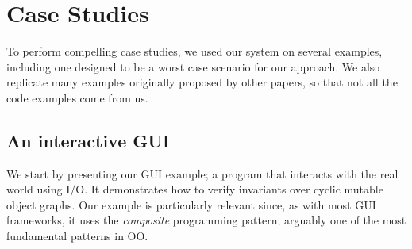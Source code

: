 
\SS\section{Case Studies} %
\label{s:case-studyAll}
To perform compelling case studies, we used our system on several examples, including one designed to be a worst case scenario for our approach. We also replicate many examples originally proposed by other papers, so that 
not all the code examples come from us. 

\subsection{An interactive GUI}
\label{s:case-study}
We start by presenting our GUI example; a program that interacts with the real world using I/O.
It demonstrates how to verify invariants over cyclic mutable object graphs.
Our example is particularly relevant since, as with most GUI frameworks, it uses the \emph{composite} programming pattern; arguably one of the most fundamental patterns in OO.

